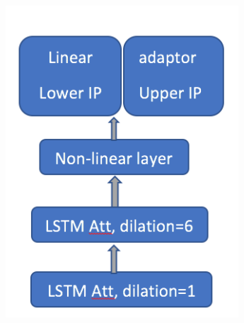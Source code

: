 \documentclass[a4paper,12pt]{article}
\theoremstyle{definition}
\begin{document}
\begin{figure}[ht]
	\centering
	\begin{subfigure}[b]{0.32\textwidth}
		\includegraphics[width=\textwidth]{figures/uber_yearly.png}
		\caption{}
		\label{fig:uber_yearly}
	\end{subfigure}
	\begin{subfigure}[b]{0.32\textwidth}

\end{subfigure}
\end{figure}
\end{document}
